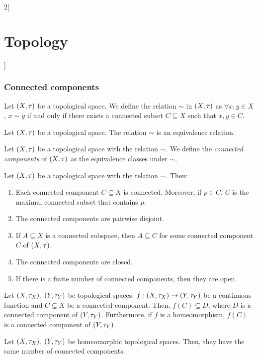 \documentclass[../../../main.tex]{subfiles}
\begin{document}
\begin{multicols}{2}[\section{Topology}]
    \subsubsection{Connected components}
    \begin{definition}
        Let $(X,\tau)$ be a topological space. We define the relation $\sim$ in $(X,\tau)$ as $\forall x,y\in X$, $x\sim y$ if and only if there exists a connected subset $C\subseteq X$ such that $x,y\in C$.
    \end{definition}
    \begin{prop}
        Let $(X,\tau)$ be a topological space. The relation $\sim$ is an equivalence relation.
    \end{prop}
    \begin{definition}
        Let $(X,\tau)$ be a topological space with the relation $\sim$. We define the \emph{connected components} of $(X,\tau)$ as the equivalence classes under $\sim$.
    \end{definition}
    \begin{prop}
        Let $(X,\tau)$ be a topological space with the relation $\sim$. Then:
        \begin{enumerate}
            \item Each connected component $C\subseteq X$ is connected. Moreover, if $p\in C$, $C$ is the maximal connected subset that contains $p$.
            \item The connected components are pairwise disjoint.
            \item If $A\subseteq X$ is a connected subspace, then $A\subseteq C$ for some connected component $C$ of $(X,\tau)$.
            \item The connected components are closed.
            \item If there is a finite number of connected components, then they are open.
        \end{enumerate}
    \end{prop}
    \begin{theorem}
        Let $(X,\tau_X)$, $(Y,\tau_Y)$ be topological spaces, $f:(X,\tau_X)\rightarrow(Y,\tau_Y)$ be a continuous function and $C\subseteq X$ be a connected component. Then, $f(C)\subseteq D$, where $D$ is a connected component of $(Y,\tau_Y)$. Furthermore, if $f$ is a homeomorphism, $f(C)$ is a connected component of $(Y,\tau_Y)$.
    \end{theorem}
    \begin{corollary}
        Let $(X,\tau_X)$, $(Y,\tau_Y)$ be homeomorphic topological spaces. Then, they have the same number of connected components.

\end{corollary}
\end{multicols}
\end{document}
